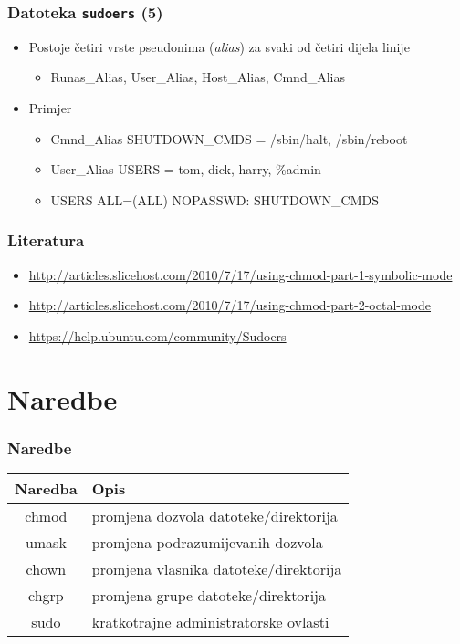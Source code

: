 \documentclass[table,usenames,dvipsnames]{beamer}
\newcommand{\shell}[1]{\texttt{#1}}
\begin{document}
\begin{frame}[t]
\frametitle{Datoteka \shell{sudoers} (5)}
\begin{itemize}
  \item Postoje četiri vrste pseudonima (\emph{alias}) za svaki od četiri 
        dijela linije
  \begin{itemize}
    \item Runas\_Alias, User\_Alias, Host\_Alias, Cmnd\_Alias
  \end{itemize}
  \item Primjer
  \begin{itemize}
    \item[] Cmnd\_Alias SHUTDOWN\_CMDS = /sbin/halt, /sbin/reboot
    \item[] User\_Alias USERS = tom, dick, harry, \%admin
    \item[] USERS ALL=(ALL) NOPASSWD: SHUTDOWN\_CMDS
  \end{itemize}
\end{itemize}
\end{frame}

\begin{frame}[t]
\frametitle{Literatura}
\begin{itemize}
  \item \url{http://articles.slicehost.com/2010/7/17/using-chmod-part-1-symbolic-mode}
  \item \url{http://articles.slicehost.com/2010/7/17/using-chmod-part-2-octal-mode}
  \item \url{https://help.ubuntu.com/community/Sudoers}
\end{itemize}
\end{frame}

\section{Naredbe}
\begin{frame}[t]
	\frametitle{Naredbe}
	\begin{table}[h]
		\begin{tabular}{|c|l|}
			\hline
			\rowcolor{BlueViolet!20}Naredba & Opis \\
			\hline
			chmod & promjena dozvola datoteke/direktorija \\
			\hline
			umask & promjena podrazumijevanih dozvola \\
			\hline
			chown & promjena vlasnika datoteke/direktorija \\
			\hline
			chgrp & promjena grupe datoteke/direktorija \\
			\hline
			sudo & kratkotrajne administratorske ovlasti \\
			\hline
		\end{tabular}
	\end{table}
\end{frame}
\end{document}

